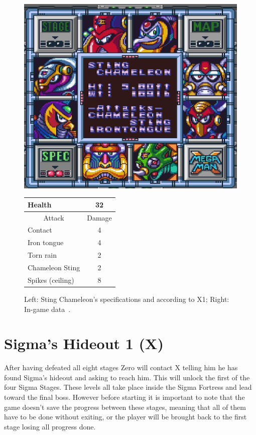 \begin{figure}[htp]
	\begin{minipage}[c]{0.45\linewidth}
		\vspace{0pt}
		\centering
		\includegraphics[width=\linewidth]{figures/X1/Sting_chameleon/Sting_chameleon_specs.png}
	\end{minipage}
	\begin{minipage}[c]{0.45\linewidth}
		\centering
		\vspace{0pt}
		\begin{tabular}[h]{l c}
			\toprule
			Health  & 32\\
			\midrule
			\multicolumn{1}{c}{Attack} & \multicolumn{1}{c}{Damage}\\
			Contact & 4\\
			Iron tongue & 4\\
			Torn rain & 2\\
			Chameleon Sting & 2\\
			Spikes (ceiling) & 8\\
			\bottomrule
		\end{tabular}
	\end{minipage}
	\caption{Left: Sting Chameleon's specifications and according to X1; Right: In-game data~\cite{wiki:Sting_chameleon}. }
	\label{Chameleon_specs}
\end{figure}

\section{Sigma's Hideout 1 (X)}
After having defeated all eight stages Zero will contact X telling him he has found Sigma's hideout and asking to reach him. This will unlock the first of the four Sigma Stages. These levels all take place inside the Sigma Fortress and lead toward the final boss. However before starting it is important to note that the game doesn't save the progress between these stages, meaning that all of them have to be done without exiting, or the player will be brought back to the first stage losing all progress done.

